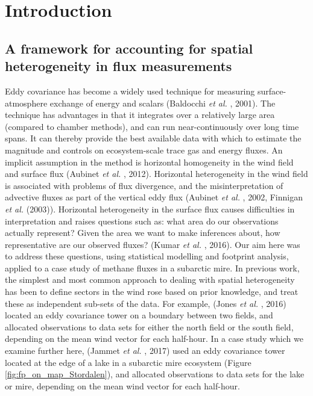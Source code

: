 \section{Introduction}\label{introduction}

\subsection{A framework for accounting for spatial heterogeneity in flux
measurements}\label{a-framework-for-accounting-for-spatial-heterogeneity-in-flux-measurements}

Eddy covariance has become a widely used technique for measuring
surface-atmosphere exchange of energy and scalars (Baldocchi \emph{et
al.} , 2001). The technique has advantages in that it integrates over a
relatively large area (compared to chamber methods), and can run
near-continuously over long time spans. It can thereby provide the best
available data with which to estimate the magnitude and controls on
ecosystem-scale trace gas and energy fluxes. An implicit assumption in
the method is horizontal homogeneity in the wind field and surface flux
(Aubinet \emph{et al.} , 2012). Horizontal heterogeneity in the wind
field is associated with problems of flux divergence, and the
misinterpretation of advective fluxes as part of the vertical eddy flux
(Aubinet \emph{et al.} , 2002, Finnigan \emph{et al.} (2003)). Horizontal
heterogeneity in the surface flux causes difficulties in interpretation
and raises questions such as: what area do our observations actually
represent? Given the area we want to make inferences about, how
representative are our observed fluxes? (Kumar \emph{et al.} , 2016). Our
aim here was to address these questions, using statistical modelling and
footprint analysis, applied to a case study of methane fluxes in a
subarctic mire.
\cite{Schaepman-Strub2009}
In previous work, the simplest and most common approach to dealing with
spatial heterogeneity has been to define sectors in the wind rose based
on prior knowledge, and treat these as independent sub-sets of the data.
For example, (Jones \emph{et al.} , 2016) located an eddy covariance
tower on a boundary between two fields, and allocated observations to
data sets for either the north field or the south field, depending on
the mean wind vector for each half-hour. In a case study which we
examine further here, (Jammet \emph{et al.} , 2017) used an eddy
covariance tower located at the edge of a lake in a subarctic mire
ecosystem (Figure \ref{fig:fp_on_map_Stordalen}), and allocated
observations to data sets for the lake or mire, depending on the mean
wind vector for each half-hour.

